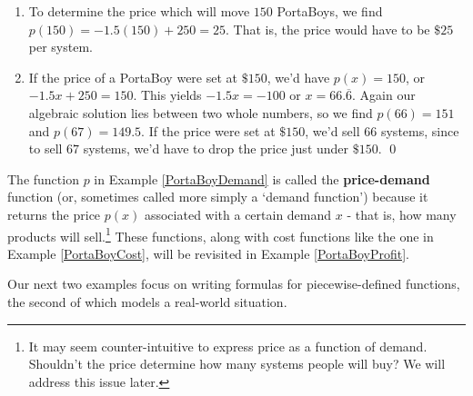 \documentclass{ximera}
\begin{document}
\begin{example}
\begin{enumerate}
\item  To determine the price which will move $150$ PortaBoys, we find $p(150) = -1.5(150) + 250 = 25$.  That is, the price would have to be $\$25$ per system.

\item  If the price of a PortaBoy were set at $\$150$, we'd have $p(x) = 150$, or $-1.5x + 250 = 150$.  This yields $-1.5x = -100$ or $x = 66.\overline{6}$. Again our algebraic solution lies between two whole numbers, so we find $p(66) = 151$ and $p(67) = 149.5$.  If the price were set at $\$ 150$, we'd sell $66$ systems, since to sell $67$ systems, we'd have to drop the price just under $\$150$.  \qed

\end{enumerate}


\end{example}


The function $p$ in Example \ref{PortaBoyDemand} is called the \textbf{price-demand} function (or, sometimes called more simply a `demand function') because it returns the price $p(x)$ associated with a certain demand $x$ - that is, how many products will sell.\footnote{It may seem counter-intuitive to express price as a function of demand.  Shouldn't the price determine how many systems people will buy?  We will address this issue later.}  These functions, along with cost functions like the one in Example \ref{PortaBoyCost}, will be revisited in Example \ref{PortaBoyProfit}.



Our next two examples focus on writing formulas for piecewise-defined functions, the second of which models a real-world situation.
\end{document}
